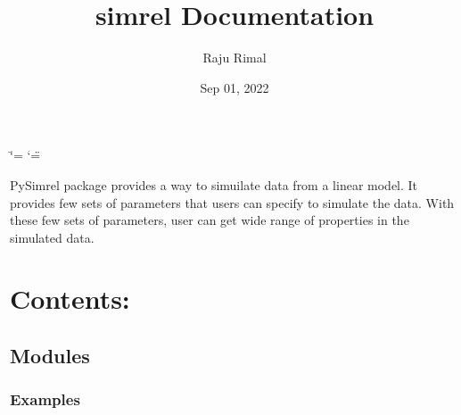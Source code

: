\documentclass[letterpaper,10pt,english]{sphinxmanual}
\title{simrel Documentation}
\date{Sep 01, 2022}
\author{Raju Rimal}
\begin{document}
\ifdefined\shorthandoff
  \ifnum\catcode`\=\string=\active\shorthandoff{=}\fi
  \ifnum\catcode`\"=\active{}\fi
\fi

\pagestyle{empty}
\sphinxmaketitle
\pagestyle{plain}
\sphinxtableofcontents
\pagestyle{normal}
\label{\detokenize{index::doc}}


\sphinxAtStartPar
PySimrel package provides a way to simuilate data from a linear model. It provides few sets of parameters that users can specify to simulate the data. With these few sets of parameters, user can get wide range of properties in the simulated data.


\chapter{Contents:}
\label{\detokenize{index:contents}}
\sphinxstepscope


\section{Modules}
\label{\detokenize{Modules:modules}}\label{\detokenize{Modules::doc}}

\subsection{Examples}
\label{\detokenize{Modules:examples}}
\begin{sphinxVerbatim}[commandchars=\\\{\}]
          
\end{sphinxVerbatim}
\end{document}
